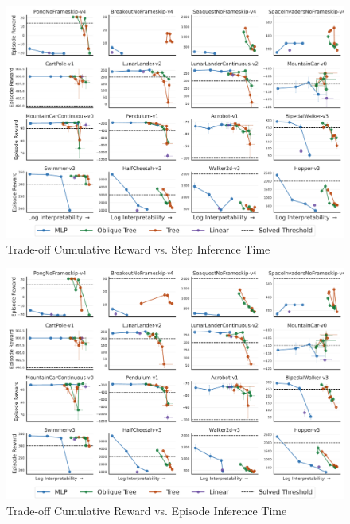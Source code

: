 \begin{figure}
    \centering
    \includegraphics[width=1\linewidth]{images/images_part3/trade_off_step_times.pdf}
    \caption{Trade-off Cumulative Reward vs. Step Inference Time}
    \label{fig:trade-off}
\end{figure}

\begin{figure}[ht]
    \centering
    \includegraphics[width=0.95\linewidth]{images/images_part3/trade_off.pdf}
    \caption{Trade-off Cumulative Reward vs. Episode Inference Time}
    \label{fig:trade-off-episode}
\end{figure}

